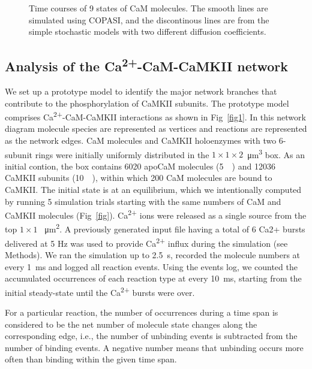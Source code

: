 \documentclass[10pt,letterpaper]{article}
\begin{document}
\begin{figure}[!h]
	\caption{{\bf}
	Time courses of 9 states of CaM molecules. The smooth lines are simulated using COPASI, and the discontinous lines are from the simple stochastic models with two different diffusion coefficients.}
\label{fig2}
\end{figure}

\subsection*{Analysis of the Ca\textsuperscript{2+}-CaM-CaMKII network}

We set up a prototype model to identify the major network branches that contribute to the phosphorylation of CaMKII subunits. The prototype model comprises Ca\textsuperscript{2+}-CaM-CaMKII interactions as shown in Fig~\ref{fig1}. In this network diagram molecule species are represented as vertices and reactions are represented as the network edges. CaM molecules and CaMKII holoenzymes with two 6-subunit rings were initially uniformly distributed in the $1 \times 1 \times 2$\SI{}{\cubic\um} box. As an initial contion, the box contains 6020 apoCaM molecules (\SI{5}{\micro\Molar}) and 12036 CaMKII subunits (\SI{10}{\micro\Molar}), within which 200 CaM molecules are bound to CaMKII. The initial state is at an equilibrium, which we intentionally computed by running 5 simulation trials starting with the same numbers of CaM and CaMKII molecules (Fig~\ref{fig}). Ca\textsuperscript{2+} ions were released as a single source from the top $1 \times 1$ \SI{}{\square\um}. A previously generated input file having a total of 6 Ca2+ bursts delivered at 5 Hz was used to provide Ca\textsuperscript{2+} influx during the simulation (see Methods). We ran the simulation up to \SI{2.5}{\s}, recorded the molecule numbers at every \SI{1}{\ms} and logged all reaction events. Using the events log, we counted the accumulated occurrences of each reaction type at every \SI{10}{\ms}, starting from the initial steady-state until the Ca\textsuperscript{2+} bursts were over.

For a particular reaction, the number of occurrences during a time span is considered to be the net number of molecule state changes along the corresponding edge, i.e., the number of unbinding events is subtracted from the number of binding events. A negative number means that unbinding occurs more often than binding within the given time span. 
\end{document}
